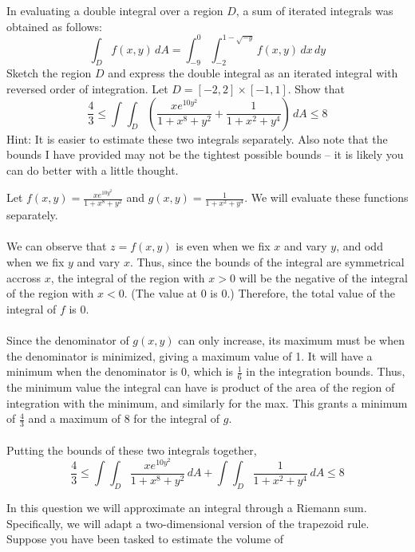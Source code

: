 \documentclass[12pt]{exam}
\begin{document}
\begin{questions}
\question In evaluating a double integral over a region $D$, a sum of iterated integrals was obtained as follows:
\[ \int_{D}f(x, y)\,dA=\int_{-9}^{0}\int_{-2}^{1-\sqrt{-y}}f(x, y)\, dx\, dy\]
Sketch the region $D$ and express the double integral as an iterated integral with reversed order of
integration.
\question Let $D = [-2, 2] \times [-1, 1]$. Show that
\[ \frac{4}{3} \leq \int_{}^{} \int_{D}^{} \left(\frac{xe^{10y^2}}{1+ x^8 + y^2} + \frac{1}{1 + x^2 + y^4} \right)\, dA \leq 8\] 
Hint: It is easier to estimate these two integrals separately. Also note that the bounds I have provided may not be the tightest possible bounds -- it is likely you can do better with a little thought.
    \begin{solution}
        Let $f(x, y) = \frac{xe^{10y^2}}{1+ x^8 + y^2}$ and $g(x, y) = \frac{1}{1 + x^2 + y^4}$. We will evaluate these functions separately.\\\\
        We can observe that $z = f(x, y)$ is even when we fix $x$ and vary $y$, and odd when we fix $y$ and vary $x$. Thus, since the bounds of the integral are symmetrical accross $x$, the integral of the region with $x>0$ will be the negative of the integral of the region with $x<0$. (The value at 0 is 0.) Therefore, the total value of the integral of $f$ is 0.\\\\
        Since the denominator of $g(x, y)$ can only increase, its maximum must be when the denominator is minimized, giving a maximum value of 1. It will have a minimum when the denominator is 0, which is $\frac{1}{6}$ in the integration bounds. Thus, the minimum value the integral can have is product of the area of the region of integration with the minimum, and similarly for the max. This grants a minimum of $\frac{4}{3}$ and a maximum of 8 for the integral of $g$.\\\\
        Putting the bounds of these two integrals together, 
        \[ \boxed{ \frac{4}{3} \leq \int_{}^{} \int_{D}^{} \frac{xe^{10y^2}}{1+ x^8 + y^2}\, dA + \int_{}^{} \int_{D}^{} \frac{1}{1 + x^2 + y^4}\, dA \leq 8 } \tag*{\qed}\] 
    \end{solution}
\question  In this question we will approximate an integral through a Riemann sum. Specifically, we will adapt a two-dimensional version of the trapezoid rule. Suppose you have been tasked to estimate the volume of

\end{questions}
\end{document}
